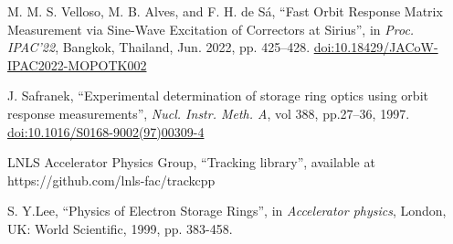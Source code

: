 \documentclass[a4paper,
               keeplastbox,   %
               ]{jacow}
\begin{document}
\begin{thebibliography}{14}
   M. M. S. Velloso, M. B. Alves, and F. H. de Sá,
   \textquotedblleft{Fast Orbit Response Matrix Measurement via Sine-Wave Excitation of Correctors at Sirius}\textquotedblright,
   in \emph{Proc. IPAC’22}, Bangkok, Thailand, Jun. 2022, pp. 425--428.
   \url{doi:10.18429/JACoW-IPAC2022-MOPOTK002}  
   
	 J. Safranek,
		\textquotedblleft{Experimental determination of storage ring optics using orbit response measurements}\textquotedblright,
		\emph{Nucl.  Instr. Meth. A}, vol 388, pp.27--36, 1997.
        \url{doi:10.1016/S0168-9002(97)00309-4}

    LNLS Accelerator Physics Group,
    \textquotedblleft{Tracking library}\textquotedblright,
    available at https://github.com/lnls-fac/trackcpp
        
    S. Y.Lee,
    \textquotedblleft{Physics of Electron Storage Rings}\textquotedblright,
    in \emph{Accelerator physics}, London, UK: World Scientific, 1999, pp. 383-458.

 






        
 
       


\end{thebibliography}
\end{document}
